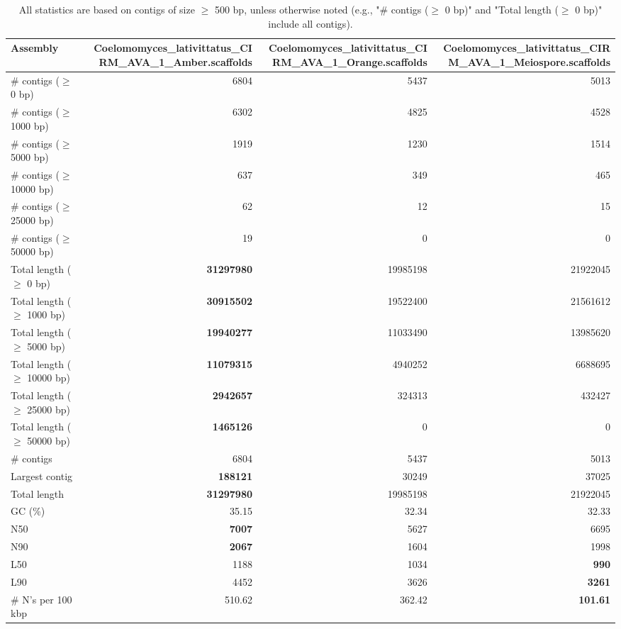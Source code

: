\documentclass[12pt,a4paper]{article}
\begin{document}
\begin{table}[ht]
\begin{center}
\caption{All statistics are based on contigs of size $\geq$ 500 bp, unless otherwise noted (e.g., "\# contigs ($\geq$ 0 bp)" and "Total length ($\geq$ 0 bp)" include all contigs).}
\begin{tabular}{|l*{3}{|r}|}
\hline
Assembly & Coelomomyces\_lativittatus\_CIRM\_AVA\_1\_Amber.scaffolds & Coelomomyces\_lativittatus\_CIRM\_AVA\_1\_Orange.scaffolds & Coelomomyces\_lativittatus\_CIRM\_AVA\_1\_Meiospore.scaffolds \\ \hline
\# contigs ($\geq$ 0 bp) & 6804 & 5437 & 5013 \\ \hline
\# contigs ($\geq$ 1000 bp) & 6302 & 4825 & 4528 \\ \hline
\# contigs ($\geq$ 5000 bp) & 1919 & 1230 & 1514 \\ \hline
\# contigs ($\geq$ 10000 bp) & 637 & 349 & 465 \\ \hline
\# contigs ($\geq$ 25000 bp) & 62 & 12 & 15 \\ \hline
\# contigs ($\geq$ 50000 bp) & 19 & 0 & 0 \\ \hline
Total length ($\geq$ 0 bp) & {\bf 31297980} & 19985198 & 21922045 \\ \hline
Total length ($\geq$ 1000 bp) & {\bf 30915502} & 19522400 & 21561612 \\ \hline
Total length ($\geq$ 5000 bp) & {\bf 19940277} & 11033490 & 13985620 \\ \hline
Total length ($\geq$ 10000 bp) & {\bf 11079315} & 4940252 & 6688695 \\ \hline
Total length ($\geq$ 25000 bp) & {\bf 2942657} & 324313 & 432427 \\ \hline
Total length ($\geq$ 50000 bp) & {\bf 1465126} & 0 & 0 \\ \hline
\# contigs & 6804 & 5437 & 5013 \\ \hline
Largest contig & {\bf 188121} & 30249 & 37025 \\ \hline
Total length & {\bf 31297980} & 19985198 & 21922045 \\ \hline
GC (\%) & 35.15 & 32.34 & 32.33 \\ \hline
N50 & {\bf 7007} & 5627 & 6695 \\ \hline
N90 & {\bf 2067} & 1604 & 1998 \\ \hline
L50 & 1188 & 1034 & {\bf 990} \\ \hline
L90 & 4452 & 3626 & {\bf 3261} \\ \hline
\# N's per 100 kbp & 510.62 & 362.42 & {\bf 101.61} \\ \hline
\end{tabular}
\end{center}
\end{table}
\end{document}
